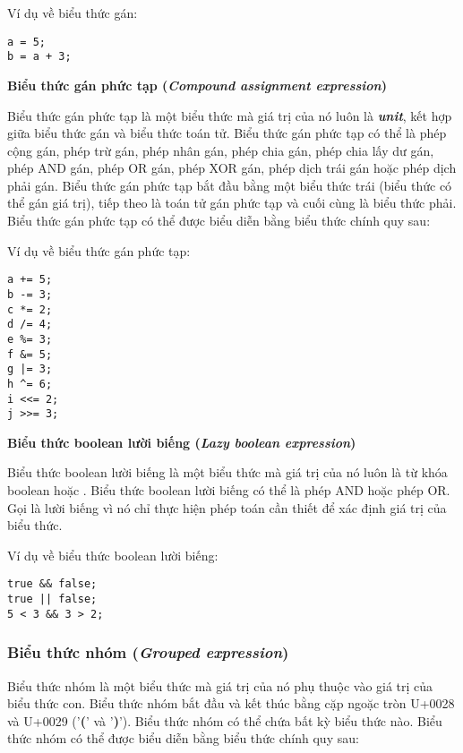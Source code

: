 \regexassignexpr

\noindent Ví dụ về biểu thức gán:
\begin{lstlisting}[]
a = 5;
b = a + 3;
\end{lstlisting}

\noindent\textbf{Biểu thức gán phức tạp (\textit{Compound assignment expression})}

    Biểu thức gán phức tạp là một biểu thức mà giá trị của nó luôn là \textbf{\textit{unit}}, kết hợp giữa biểu thức gán và biểu thức toán tử. Biểu thức gán phức tạp có thể là phép cộng gán, phép trừ gán, phép nhân gán, phép chia gán, phép chia lấy dư gán, phép AND gán, phép OR gán, phép XOR gán, phép dịch trái gán hoặc phép dịch phải gán. Biểu thức gán phức tạp bắt đầu bằng một biểu thức trái (biểu thức có thể gán giá trị), tiếp theo là toán tử gán phức tạp và cuối cùng là biểu thức phải. Biểu thức gán phức tạp có thể được biểu diễn bằng biểu thức chính quy sau: 

\regexcompoundassignexpr

\noindent Ví dụ về biểu thức gán phức tạp:
\begin{lstlisting}[]
a += 5;
b -= 3;
c *= 2;
d /= 4;
e %= 3;
f &= 5;
g |= 3;
h ^= 6;
i <<= 2;
j >>= 3;
\end{lstlisting}

\noindent\textbf{Biểu thức boolean lười biếng (\textit{Lazy boolean expression})}

    Biểu thức boolean lười biếng là một biểu thức mà giá trị của nó luôn là từ khóa boolean  hoặc . Biểu thức boolean lười biếng có thể là phép AND hoặc phép OR. Gọi là lười biếng vì nó chỉ thực hiện phép toán cần thiết để xác định giá trị của biểu thức.

\regexlazyboolexpr

\noindent Ví dụ về biểu thức boolean lười biếng:
\begin{lstlisting}[]
true && false;
true || false;
5 < 3 && 3 > 2;
\end{lstlisting}

\subsubsection{Biểu thức nhóm (\textit{Grouped expression})}

    Biểu thức nhóm là một biểu thức mà giá trị của nó phụ thuộc vào giá trị của biểu thức con. Biểu thức nhóm bắt đầu và kết thúc bằng cặp ngoặc tròn U+0028 và U+0029 ('\textbf{(}' và '\textbf{)}'). Biểu thức nhóm có thể chứa bất kỳ biểu thức nào. Biểu thức nhóm có thể được biểu diễn bằng biểu thức chính quy sau:

